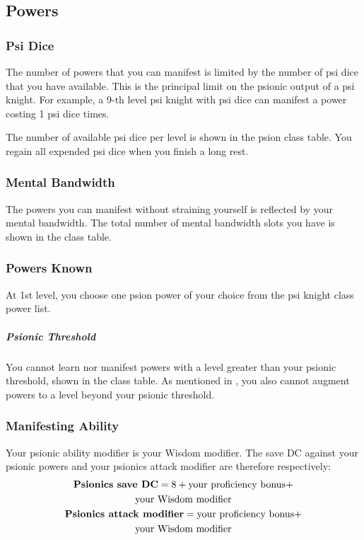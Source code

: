 \subsection{Powers}
\subsubsection{Psi Dice}
The number of powers that you can manifest
is limited by the number of psi dice that
you have available.
This is the principal limit on the psionic output of a psi knight.
For example, a 9-th level psi knight with {\pklvlnine} psi dice
can manifest a power costing 1 psi dice {\pklvlnine} times.

The number of available psi dice per level
is shown in the psion class table.
You regain all expended psi dice when you finish
a long rest.

\subsubsection{Mental Bandwidth}
The powers you can manifest without straining yourself
is reflected by your mental bandwidth.
The total number of mental bandwidth slots you have
is shown in the class table.

\subsubsection{Powers Known}
At 1st level,
you choose one psion power of your choice
from the psi knight class power list.

\subparagraph{Psionic Threshold}
You cannot learn nor manifest powers with a level
greater than your psionic threshold,
shown in the class table.
As mentioned in ,
you also cannot augment powers to a level
beyond your psionic threshold.

\subsubsection{Manifesting Ability}
Your psionic ability modifier is your Wisdom modifier.
The save DC against your psionic powers and your
psionics attack modifier are therefore respectively:
\small\begin{equation*}
    \begin{gathered}
        \text{\textbf{Psionics save DC}}
            = 8 + \text{your proficiency bonus} + \\
                  \text{your Wisdom modifier} \\
        \text{\textbf{Psionics attack modifier}}
            = \text{your proficiency bonus} + \\
              \text{your Wisdom modifier}
    \end{gathered}
\end{equation*}\normalsize

